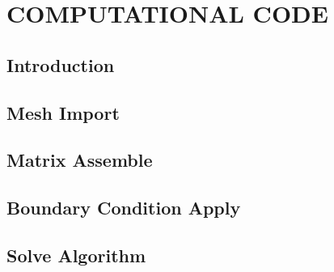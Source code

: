 \chapter{\textbf{COMPUTATIONAL CODE}}
\label{codigo numerico}

\section{\textbf{Introduction}} 


\section{\textbf{Mesh Import}} 
\label{trimesh}



\section{\textbf{Matrix Assemble}} 
\label{trielem}



\section{\textbf{Boundary Condition Apply}} 
\label{tricond}



\section{\textbf{Solve Algorithm}} 
\label{simulador}




